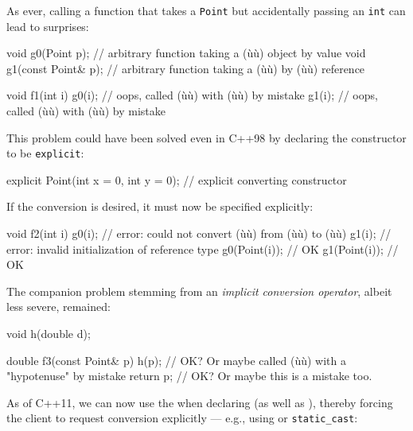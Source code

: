 \noindent As ever, calling a function that takes a \lstinline!Point! but
accidentally passing an \lstinline!int! can lead to surprises:

\begin{emcppslisting}[language=C++]
void g0(Point p);         // arbitrary function taking a (ù{}ù) object by value
void g1(const Point& p);  // arbitrary function taking a (ù{}ù) by (ù{}ù) reference

void f1(int i)
{
    g0(i);  // oops, called (ù{}ù) with (ù{}ù) by mistake
    g1(i);  // oops, called (ù{}ù) with (ù{}ù) by mistake
}
\end{emcppslisting}
    
\noindent This problem could have been solved even in C++98 by declaring the
constructor to be \lstinline!explicit!:

\begin{emcppslisting}[language=C++]
explicit Point(int x = 0, int y = 0);  // explicit converting constructor
\end{emcppslisting}
    
\noindent If the conversion is desired, it must now be specified explicitly:

\begin{emcppslisting}[language=C++]
void f2(int i)
{
    g0(i);         // error: could not convert (ù{}ù) from (ù{}ù) to (ù{}ù)
    g1(i);         // error: invalid initialization of reference type
    g0(Point(i));  // OK
    g1(Point(i));  // OK
}
\end{emcppslisting}
    
\noindent The companion problem stemming from an \emph{implicit conversion
operator}, albeit less severe, remained:

\begin{emcppslisting}[language=C++]
void h(double d);

double f3(const Point& p)
{
    h(p);      // OK? Or maybe called (ù{}ù) with a "hypotenuse" by mistake
    return p;  // OK? Or maybe this is a mistake too.
}
\end{emcppslisting}
    
\noindent As of C++11, we can now use the 
when declaring  (as well as
), thereby forcing the client to request
conversion explicitly --- e.g., using  or
\lstinline!static_cast!:

